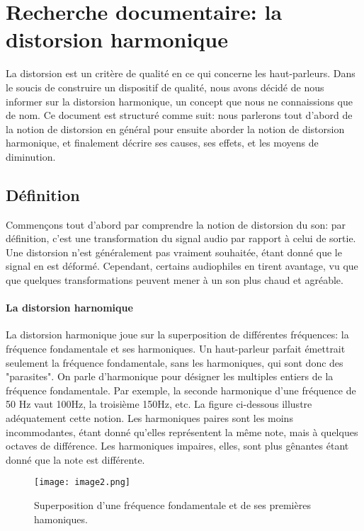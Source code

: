 

\section{Recherche documentaire: la distorsion harmonique}

La distorsion est un critère de qualité en ce qui concerne les haut-parleurs.
Dans le soucis de construire un dispositif de qualité, nous avons décidé de 
nous informer sur la distorsion harmonique, un concept que nous ne connaissions
que de nom.
Ce document est structuré comme suit: nous parlerons tout d'abord de la notion  de distorsion 
en général pour ensuite aborder la notion  de distorsion 
harmonique, et finalement décrire ses causes, ses effets,
et les moyens de diminution.

\subsection{Définition}
Commençons tout d'abord par comprendre la notion de distorsion du son: par définition, c'est
une transformation du signal audio par rapport à celui de sortie. Une distorsion n'est généralement pas vraiment souhaitée, étant donné
que le signal en est déformé. Cependant, certains audiophiles en tirent avantage, vu que que quelques
transformations peuvent mener à un son plus chaud et agréable.

\paragraph{La distorsion harnomique}
La distorsion harmonique joue sur la superposition de différentes fréquences:
la fréquence fondamentale et ses harmoniques. Un haut-parleur parfait émettrait seulement la fréquence fondamentale, sans les harmoniques, qui sont donc des "parasites".
On parle d'harmonique pour désigner les multiples entiers de la fréquence fondamentale.
Par exemple, la seconde harmonique d'une fréquence de 50 Hz vaut 100Hz, la troisième 150Hz, etc. La figure 
ci-dessous illustre adéquatement cette notion.
Les harmoniques paires sont les moins incommodantes, étant donné qu'elles représentent la même note, mais à quelques octaves de différence.
Les harmoniques impaires, elles, sont plus gênantes étant donné que la note est différente.

\begin{figure}[h]
\centering
\texttt{[image: image2.png]}
\caption{Superposition d'une fréquence fondamentale et de ses premières hamoniques.}
\label{Superposition d'une fréquence fondamentale et de ses premières hamoniques.}
\end{figure}

